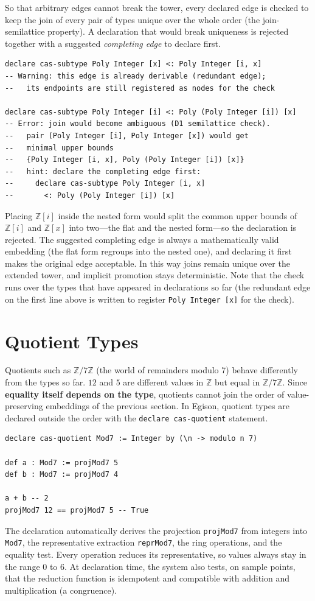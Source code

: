 So that arbitrary edges cannot break the tower, every declared edge is checked to keep the join of every pair of types unique over the whole order (the join-semilattice property).
A declaration that would break uniqueness is rejected together with a suggested \emph{completing edge} to declare first.
\begin{lstlisting}[language=egison,numbers=none]
declare cas-subtype Poly Integer [x] <: Poly Integer [i, x]
-- Warning: this edge is already derivable (redundant edge);
--   its endpoints are still registered as nodes for the check

declare cas-subtype Poly Integer [i] <: Poly (Poly Integer [i]) [x]
-- Error: join would become ambiguous (D1 semilattice check).
--   pair (Poly Integer [i], Poly Integer [x]) would get
--   minimal upper bounds
--   {Poly Integer [i, x], Poly (Poly Integer [i]) [x]}
--   hint: declare the completing edge first:
--     declare cas-subtype Poly Integer [i, x]
--       <: Poly (Poly Integer [i]) [x]
\end{lstlisting}
Placing $\mathbb{Z}[i]$ inside the nested form would split the common upper bounds of $\mathbb{Z}[i]$ and $\mathbb{Z}[x]$ into two---the flat and the nested form---so the declaration is rejected.
The suggested completing edge is always a mathematically valid embedding (the flat form regroups into the nested one), and declaring it first makes the original edge acceptable.
In this way joins remain unique over the extended tower, and implicit promotion stays deterministic.
Note that the check runs over the types that have appeared in declarations so far (the redundant edge on the first line above is written to register \lstinline{Poly Integer [x]} for the check).

\section{Quotient Types}\label{cas-quotient}

Quotients such as $\mathbb{Z}/7\mathbb{Z}$ (the world of remainders modulo 7) behave differently from the types so far.
$12$ and $5$ are different values in $\mathbb{Z}$ but equal in $\mathbb{Z}/7\mathbb{Z}$.
Since \textbf{equality itself depends on the type}, quotients cannot join the order of value-preserving embeddings of the previous section.
In Egison, quotient types are declared outside the order with the \lstinline{declare cas-quotient} statement.
\begin{lstlisting}[language=egison,numbers=none]
declare cas-quotient Mod7 := Integer by (\n -> modulo n 7)

def a : Mod7 := projMod7 5
def b : Mod7 := projMod7 4

a + b -- 2
projMod7 12 == projMod7 5 -- True
\end{lstlisting}
The declaration automatically derives the projection \lstinline{projMod7} from integers into \lstinline{Mod7}, the representative extraction \lstinline{reprMod7}, the ring operations, and the equality test.
Every operation reduces its representative, so values always stay in the range $0$ to $6$.
At declaration time, the system also tests, on sample points, that the reduction function is idempotent and compatible with addition and multiplication (a congruence).

